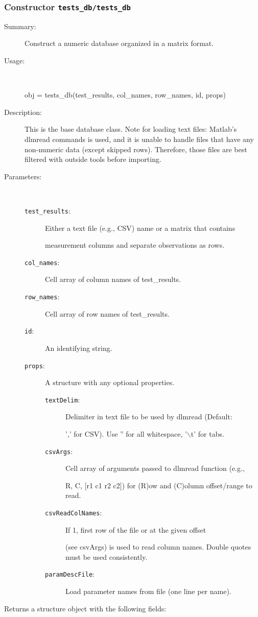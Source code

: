 \subsubsection[Constructor \texttt{tests\_db}]{Constructor \texttt{tests\_db/tests\_db}}%
%
\label{ref_tests_db__tests_db}%
\hypertarget{ref_tests_db__tests_db}{}%
\begin{description}
\item[Summary:]Construct a numeric database organized in a matrix format.
%
\item[Usage:]~%
\begin{lyxcode}%
obj = tests\_db(test\_results, col\_names, row\_names, id, props)
%
\end{lyxcode}%
%
\item[Description:]%
This is the base database class. Note for loading text files:
 Matlab's dlmread commands is used, and it is unable to handle files that
 have any non-numeric data (except skipped rows). Therefore, those files
 are best filtered with outside tools before importing.
\item[Parameters:]~
\begin{description}%
\item[\texttt{test\_results}:]
 Either a text file (e.g., CSV) name or a matrix that contains

measurement columns and separate observations as rows.
\item[\texttt{col\_names}:]
 Cell array of column names of test\_results.
\item[\texttt{row\_names}:]
 Cell array of row names of test\_results.
\item[\texttt{id}:]
 An identifying string.
\item[\texttt{props}:]
 A structure with any optional properties.
\begin{description}%
\item[\texttt{textDelim}:]
 Delimiter in text file to be used by dlmread (Default:

',' for CSV). Use '' for all whitespace, '$\backslash$t' for tabs.
\item[\texttt{csvArgs}:]
 Cell array of arguments passed to dlmread function (e.g.,

{R, C, [r1 c1 r2 c2]}) for (R)ow and (C)olumn offset/range to read.
\item[\texttt{csvReadColNames}:]
 If 1, first row of the file or at the given offset

(see csvArgs) is used to read column names. Double quotes must be
used consistently.
\item[\texttt{paramDescFile}:]
 Load parameter names from file (one line per name).
\end{description}%
\end{description}%
%
\item[Returns a structure object with the following fields:
]~


\end{description}
